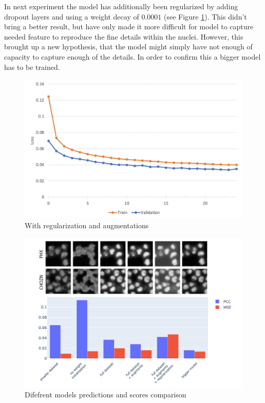 In next experiment the model has additionally been regularized by adding dropout layers and using a weight decay of $0.0001$ (see Figure \ref{fig:full-dataset-pcc-regularized}). This didn't bring a better result, but have only made it more difficult for model to capture needed feature to reproduce the fine details within the nuclei. However, this brought up a new hypothesis, that the model might simply have not enough of capacity to capture enough of the details. In order to confirm this a bigger model has to be trained.
\begin{figure}[H]
	\begin{center}
		\includegraphics[width=0.8\linewidth]{bilder/nuclei/full-dataset-regularized.jpg}
		\caption{With regularization and augmentations}\label{fig:full-dataset-pcc-regularized}
	\end{center}
\end{figure}

\begin{figure}[H]
	\begin{center}
		\includegraphics[width=0.8\linewidth]{bilder/nuclei/comparison-chzn-phx.png}
		\caption{Difefrent models predictions and scores comparison}\label{fig:nuclei-comparison-predictions}
	\end{center}
\end{figure}

